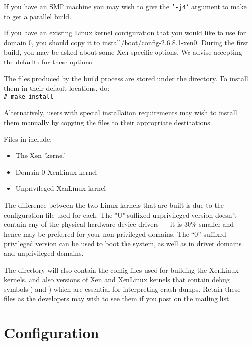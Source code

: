 \documentclass[11pt,twoside,final,openright]{xenstyle}
\begin{document}
If you have an SMP machine you may wish to give the {\tt '-j4'}
argument to make to get a parallel build.

If you have an existing Linux kernel configuration that you would like
to use for domain 0, you should copy it to
install/boot/config-2.6.8.1-xen0.  During the first build, you may be
asked about some Xen-specific options.  We advise accepting the
defaults for these options.


The files produced by the build process are stored under the
 directory.  To install them in their default
locations, do: \\
\verb_# make install_

Alternatively, users with special installation requirements may wish
to install them manually by copying the files to their appropriate
destinations.

Files in  include:
\begin{itemize}
\item {} The Xen 'kernel'
\item {}  Domain 0 XenLinux kernel
\item {}  Unprivileged XenLinux kernel
\end{itemize}

The difference between the two Linux kernels that are built is due to
the configuration file used for each.  The "U" suffixed unprivileged
version doesn't contain any of the physical hardware device drivers
--- it is 30\% smaller and hence may be preferred for your
non-privileged domains.  The ``0'' suffixed privileged version can be
used to boot the system, as well as in driver domains and unprivileged
domains.

The  directory will also contain the config files
used for building the XenLinux kernels, and also versions of Xen and
XenLinux kernels that contain debug symbols ( and
) which are essential for interpreting crash
dumps.  Retain these files as the developers may wish to see them if
you post on the mailing list.

\section{Configuration}
\end{document}
